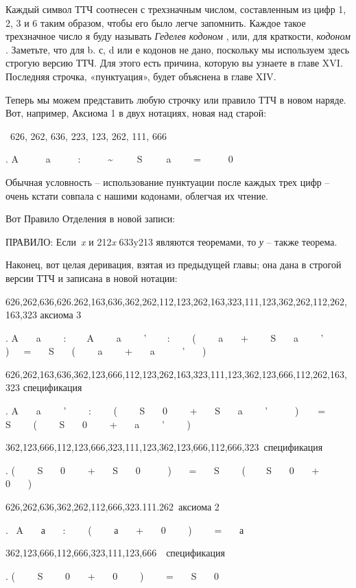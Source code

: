\documentclass[../main.tex]{subfiles}
\begin{document}
Каждый символ ТТЧ соотнесен с трехзначным числом, составленным из цифр 1, 2, 3 и 6 таким образом, чтобы его было легче запомнить. Каждое такое трехзначное число я буду называть \emph{Геделев кодоном} , или, для краткости, \emph{кодоном} . Заметьте, что для b. с, d или е кодонов не дано, поскольку мы используем здесь строгую версию ТТЧ. Для этого есть причина, которую вы узнаете в главе XVI. Последняя строчка, «пунктуация», будет объяснена в главе XIV.

Теперь мы можем представить любую строчку или правило ТТЧ в новом наряде. Вот, например, Аксиома 1 в двух нотациях, новая над старой:

~626, 262, 636, 223, 123, 262, 111, 666

. A~~~~~ a~~~~ ~:~~~~~ \textasciitilde~~~~~S~~~~~a~~~~ =~~~~~ 0

Обычная условность \--- использование пунктуации после каждых трех цифр \--- очень кстати совпала с нашими кодонами, облегчая их чтение.

Вот Правило Отделения в новой записи:

ПРАВИЛО: Если~\emph{x} и 212\emph{x} 633y213 являются теоремами, то \emph{у} \--- также теорема.

Наконец, вот целая деривация, взятая из предыдущей главы; она дана в строгой версии ТТЧ и записана в новой нотации:

626,262,636,626.262,163,636,362,262,112,123,262,163,323,111,123,362,262,112,262,163,323 аксиома 3

. A~~~ a~~~~ :~ ~~ A~~~ ~a~~~~ '~~ ~ :~~~~ (~~~ ~a~~~ +~~~~ S~~~ a~~~~ '~~~~ )~~~=~~~ S~~~ (~~~~ a~~~~ +~~~ a~~~~~ '~~~ )

626,262,163,636,362,123,666,112,123,262,163,323,111,123,362,123,666,112,262,163,323 спецификация

. A~~~ a~~~~ '~~~~ :~~~~ (~~~~ S~~ ~0~~~~ +~~~ S~~~ a~~~~ '~~~~~ )~~~~=~~~ S~~~~ (~~~~ S~~~ 0~~~~ +~~~ a~~~~ '~~~~ )

362,123,666,112,123,666,323,111,123,362,123,666,112,666,323~спецификация

. (~~~~ S~~~ 0~~~~ +~~~ S~~~ 0~~~~~ )~~~ =~~~ S~~~~ ( ~~~ S~~~ 0~~~ +~~~~ 0~~~ )

626,262,636,362,262,112,666,323.111.262~аксиома 2

.~ A~~~ а~~ ~:~~~~ (~~~~ а~~~ +~~~ 0~~~ ~)~~~~ =~~~ а

362,123,666,112,666,323,111,123,666~~спецификация

. (~~~~ S~~~~ 0~~~ +~~ ~0~~~~ )~~~~ =~~~ S~~~ 0
\end{document}

